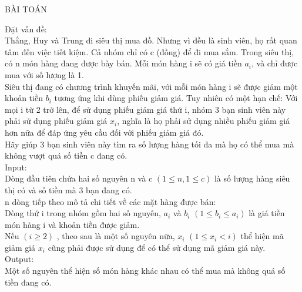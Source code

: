 \documentclass[10pt,a4paper]{article}
\begin{document}
\begin{center}
    \fontsize{30}{30}\selectfont
    BÀI TOÁN \\
\end{center}

\begin{flushleft}
    \fontsize{14}{20}\selectfont
    Đặt vấn đề:\\
    Thắng, Huy và Trung đi siêu thị mua đồ. Nhưng vì đều là sinh viên, họ rất quan tâm đến việc tiết kiệm. Cả nhóm chỉ có c (đồng) để đi mua sắm. Trong siêu thị, có n món hàng đang được bày bán. Mỗi món hàng i sẽ có giá tiền $a_i$, và chỉ được mua với số lượng là 1.\\
    Siêu thị đang có chương trình khuyến mãi, với mỗi món hàng i sẽ được giảm một khoản tiền $b_i$ tương ứng khi dùng phiếu giảm giá. Tuy nhiên có một hạn chế: Với mọi i từ 2 trở lên, để sử dụng phiếu giảm giá thứ i, nhóm 3 bạn sinh viên này phải sử dụng phiếu giảm giá $x_i$, nghĩa là họ phải sử dụng nhiều phiếu giảm giá hơn nữa để đáp ứng yêu cầu đối với phiếu giảm giá đó.\\
    Hãy giúp 3 bạn sinh viên này tìm ra số lượng hàng tối đa mà họ có thể mua mà không vượt quá số tiền c đang có.\\
    \vspace{1 cm}
    Input:\\
    Dòng đầu tiên chứa hai số nguyên n và c $(1 \le n, 1 \le c)$ là số lượng hàng siêu thị có và số tiền mà 3 bạn đang có.\\
    n dòng tiếp theo mô tả chi tiết về các mặt hàng được bán:\\
    Dòng thứ i trong nhóm gồm hai số nguyên, $a_i$ và $b_i$ $(1 \le b_i \le a_i)$ là giá tiền món hàng i và khoản tiền được giảm.\\
    Nếu $(i \ge 2)$ , theo sau là một số nguyên nữa, $x_i$ $(1 \le x_i < i)$ thể hiện mã giảm giá $x_i$ cũng phải được sử dụng để có thể sử dụng mã giảm giá này.\\
    \vspace{1 cm}
    Output:\\
    Một số nguyên thể hiện số món hàng khác nhau có thể mua mà không quá số tiền đang có.
\end{flushleft}
\end{document}
